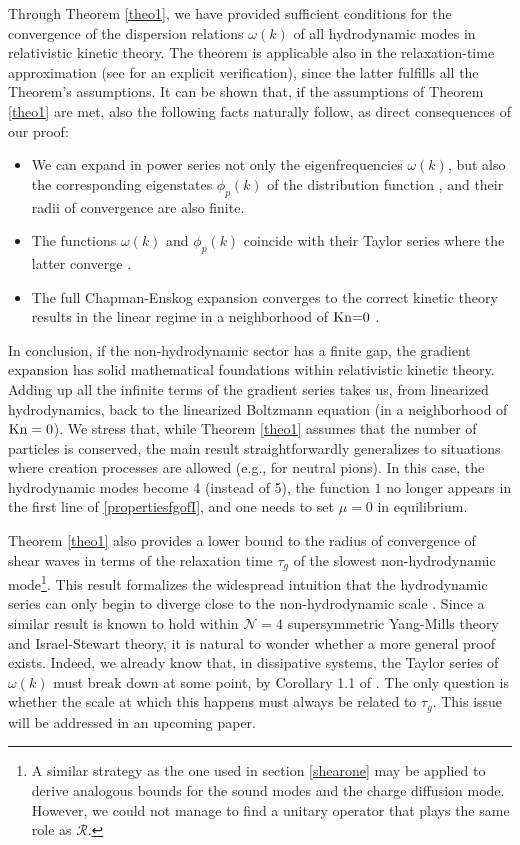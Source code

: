 \documentclass[a4paper, amsfonts, amssymb, amsmath, reprint, showkeys, nofootinbib, twoside, onecolumn,notitlepage]{revtex4-2}
\theoremstyle{definition}
\theoremstyle{theorem}
\newcommand{\Kn}{\textup{Kn}}
\theoremstyle{corollary}
\begin{document}
Through Theorem \ref{theo1}, we have provided sufficient conditions for the convergence of the dispersion relations $\omega(k)$ of all hydrodynamic modes in relativistic kinetic theory. The theorem is applicable also in the relaxation-time approximation (see \cite[\S 4.1]{Brants:2024wrx} for an explicit verification), since the latter fulfills all the Theorem's assumptions. It can be shown that, if the assumptions of Theorem \ref{theo1} are met, also the following facts naturally follow, as direct consequences of our proof:
\begin{itemize}
\item We can expand in power series not only the eigenfrequencies $\omega(k)$, but also the corresponding eigenstates $\phi_p(k)$ of the distribution function \cite{KatoAmazing1949,Dudynski1989,McLennan1965}, and their radii of convergence are also finite.
\item The functions $\omega(k)$ and $\phi_p(k)$ coincide with their Taylor series where the latter converge \cite{KatoAmazing1949}.
\item The full Chapman-Enskog expansion converges to the correct kinetic theory results in the linear regime in a neighborhood of $\Kn{=}0$ \cite{McLennan1965}.
\end{itemize}
In conclusion, if the non-hydrodynamic sector has a finite gap, the gradient expansion has solid mathematical foundations within relativistic kinetic theory. Adding up all the infinite terms of the gradient series takes us, from linearized hydrodynamics, back to the linearized Boltzmann equation (in a neighborhood of $\Kn=0$). We stress that, while Theorem \ref{theo1} assumes that the number of particles is conserved, the main result straightforwardly generalizes to situations where creation processes are allowed (e.g., for neutral pions). In this case, the hydrodynamic modes become 4 (instead of 5), the function $1$ no longer appears in the first line of \eqref{propertiesfgofI}, and one needs to set $\mu=0$ in equilibrium. 

Theorem \ref{theo1} also provides a lower bound to the radius of convergence of shear waves in terms of the relaxation time $\tau_g$ of the slowest non-hydrodynamic mode\footnote{A similar strategy as the one used in section \ref{shearone} may be applied to derive analogous bounds for the sound modes and the charge diffusion mode. However, we could not manage to find a unitary operator that plays the same role as $\mathcal{R}$.}. This result formalizes the widespread intuition that the hydrodynamic series can only begin to diverge close to the non-hydrodynamic scale \cite{HellerHydrohedron2023jtd}. Since a similar result is known to hold within $\mathcal{N}=4$ supersymmetric Yang-Mills theory and Israel-Stewart theory, it is natural to wonder whether a more general proof exists. Indeed, we already know that, in dissipative systems, the Taylor series of $\omega(k)$ must break down at some point, by Corollary 1.1 of \cite{HellerBounds2022ejw}. The only question is whether the scale at which this happens must always be related to $\tau_g$. This issue will be addressed in an upcoming paper.  
\end{document}
